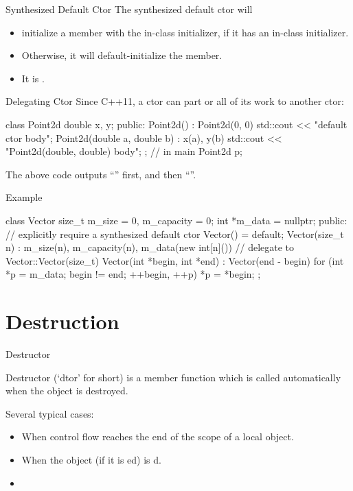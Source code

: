 \documentclass{beamer}
\begin{document}
\begin{frame}{Synthesized Default Ctor}
    The synthesized default ctor will
    \begin{itemize}
        \item initialize a member with the in-class initializer, if it has an in-class initializer.
        \item Otherwise, it will default-initialize the member.
        \item It is .
    \end{itemize}
\end{frame}

\begin{frame}[fragile]{Delegating Ctor}
    Since C++11, a ctor can  part or all of its work to another ctor:
    \begin{cpp}
class Point2d {
  double x, y;
 public:
  Point2d() : Point2d(0, 0) {
    std::cout << "default ctor body\n";
  }
  Point2d(double a, double b) : x(a), y(b) {
    std::cout << "Point2d(double, double) body\n";
  }
};
// in main
Point2d p;
    \end{cpp}
    The above code outputs ``'' first, and then ``''.
\end{frame}

\begin{frame}[fragile]{Example}
    \begin{cpp}
class Vector {
  size_t m_size = 0, m_capacity = 0;
  int *m_data = nullptr;
 public:
  // explicitly require a synthesized default ctor
  Vector() = default;
  Vector(size_t n) : m_size(n), m_capacity(n),
    m_data(new int[n]()) {}
  // delegate to Vector::Vector(size_t)
  Vector(int *begin, int *end) : Vector(end - begin) {
    for (int *p = m_data; begin != end; ++begin, ++p)
      *p = *begin;
  }
};
    \end{cpp}
\end{frame}

\section{Destruction}

\begin{frame}{Destructor}
    \begin{definition}[Destructor]
        Destructor (`dtor' for short) is a member function which is called automatically when the object is destroyed.
    \end{definition}
    Several typical cases:
    \begin{itemize}
        \item When control flow reaches the end of the scope of a local object.
        \item When the object (if it is ed) is d.
        \item {}
    \end{itemize}
\end{frame}
\end{document}
